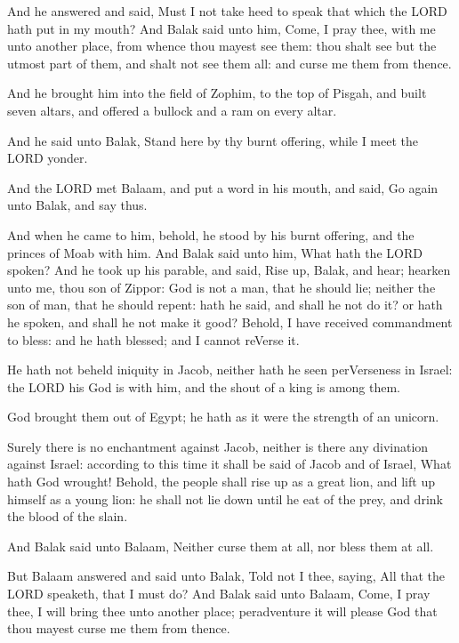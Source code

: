 \Verse And he answered and said, Must I not take heed to speak that
which the LORD hath put in my mouth?  \Verse And Balak said unto him,
Come, I pray thee, with me unto another place, from whence thou mayest
see them: thou shalt see but the utmost part of them, and shalt not
see them all: and curse me them from thence.

\Verse And he brought him into the field of Zophim, to the top of
Pisgah, and built seven altars, and offered a bullock and a ram on
every altar.

\Verse And he said unto Balak, Stand here by thy burnt offering, while
I meet the LORD yonder.

\Verse And the LORD met Balaam, and put a word in his mouth, and said,
Go again unto Balak, and say thus.

\Verse And when he came to him, behold, he stood by his burnt offering,
and the princes of Moab with him. And Balak said unto him, What hath
the LORD spoken?  \Verse And he took up his parable, and said, Rise up,
Balak, and hear; hearken unto me, thou son of Zippor: \Verse God is not
a man, that he should lie; neither the son of man, that he should
repent: hath he said, and shall he not do it? or hath he spoken, and
shall he not make it good?  \Verse Behold, I have received commandment
to bless: and he hath blessed; and I cannot reVerse it.

\Verse He hath not beheld iniquity in Jacob, neither hath he seen
perVerseness in Israel: the LORD his God is with him, and the shout of
a king is among them.

\Verse God brought them out of Egypt; he hath as it were the strength
of an unicorn.

\Verse Surely there is no enchantment against Jacob, neither is there
any divination against Israel: according to this time it shall be said
of Jacob and of Israel, What hath God wrought!  \Verse Behold, the
people shall rise up as a great lion, and lift up himself as a young
lion: he shall not lie down until he eat of the prey, and drink the
blood of the slain.

\Verse And Balak said unto Balaam, Neither curse them at all, nor bless
them at all.

\Verse But Balaam answered and said unto Balak, Told not I thee,
saying, All that the LORD speaketh, that I must do?  \Verse And Balak
said unto Balaam, Come, I pray thee, I will bring thee unto another
place; peradventure it will please God that thou mayest curse me them
from thence.

